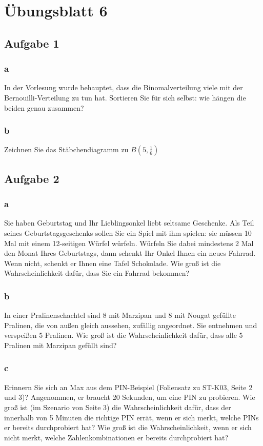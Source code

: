 \chapter{Übungsblatt 6}

\section{Aufgabe 1}

\subsection{a}
In der Vorlesung wurde behauptet, dass die Binomalverteilung viele mit der Bernouilli-Verteilung zu tun hat. Sortieren Sie für sich selbst: wie hängen die beiden genau zusammen?

\subsection{b}
Zeichnen Sie das Stäbchendiagramm zu $B(5,\frac{1}{6})$

\section{Aufgabe 2}

\subsection{a}

Sie haben Geburtstag und Ihr Lieblingsonkel liebt seltsame Geschenke. Als Teil seines Geburtstagsgeschenks sollen Sie ein Spiel mit ihm spielen: sie müssen 10 Mal mit einem 12-seitigen Würfel würfeln. Würfeln Sie dabei mindestens 2 Mal den Monat Ihres Geburtstags, dann schenkt Ihr Onkel Ihnen ein neues Fahrrad. Wenn nicht, schenkt er Ihnen eine Tafel Schokolade. Wie groß ist die Wahrscheinlichkeit dafür, dass Sie ein Fahrrad bekommen?

\subsection{b} 

In einer Pralinenschachtel sind 8 mit Marzipan und 8 mit Nougat gefüllte Pralinen, die von außen gleich aussehen, zufällig angeordnet. Sie entnehmen und verspeißen 5 Pralinen. Wie groß ist die Wahrscheinlichkeit dafür, dass alle 5 Pralinen mit Marzipan gefüllt sind?

\subsection{c}

Erinnern Sie sich an Max aus dem PIN-Beispiel (Foliensatz zu ST-K03, Seite 2 und 3)? Angenommen, er braucht 20 Sekunden, um eine PIN zu probieren. Wie groß ist (im Szenario von Seite 3) die Wahrscheinlichkeit dafür, dass der innerhalb von 5 Minuten die richtige PIN errät, wenn er sich merkt, welche PINs er bereits durchprobiert hat? Wie groß ist die Wahrscheinlichkeit, wenn er sich nicht merkt, welche Zahlenkombinationen er bereits durchprobiert hat?